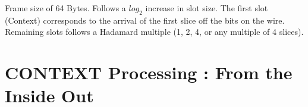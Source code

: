 \documentclass[../HFT-main.tex]{subfiles}
\begin{document}

Frame size  of 64 Bytes. Follows a $log_2$ increase in slot size.  The first slot (Context) corresponds to the arrival of the first slice off the bits on the wire. Remaining slots follows a Hadamard multiple (1, 2, 4, or any multiple of 4 slices).


\section{CONTEXT Processing : From the Inside Out}
\end{document}

